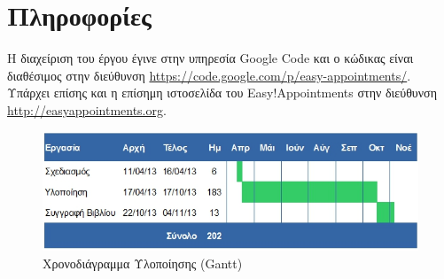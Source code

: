 \section{Πληροφορίες}
Η διαχείριση του έργου έγινε στην υπηρεσία Google Code και ο κώδικας είναι διαθέσιμος στην διεύθυνση \url{https://code.google.com/p/easy-appointments/}. Υπάρχει επίσης και η επίσημη ιστοσελίδα του Easy!Appointments στην διεύθυνση \url{http://easyappointments.org}.
\newline
\begin{figure}[H]
\centering
\includegraphics[width=150mm]{images/gantt-simple.jpg}
\caption{Χρονοδιάγραμμα Υλοποίησης (Gantt)}
\label{gantt-simple}
\end{figure}